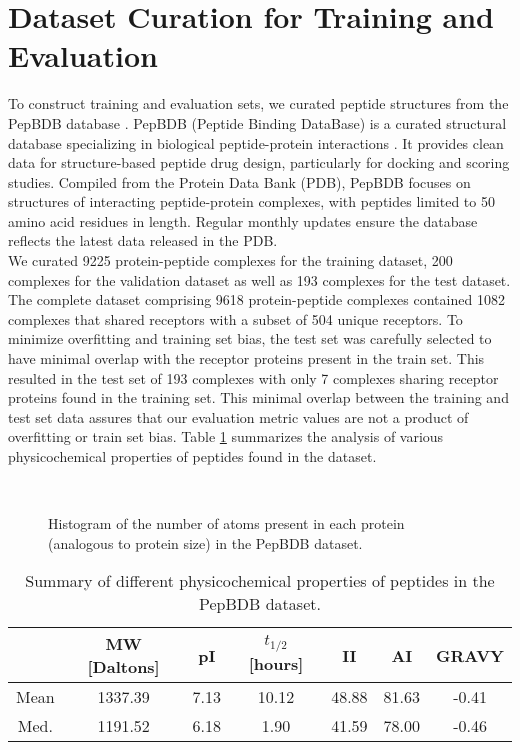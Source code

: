 \section{Dataset Curation for Training and Evaluation}
To construct training and evaluation sets, we curated peptide structures from the PepBDB database \cite{Wen2019}. PepBDB (Peptide Binding DataBase) is a curated structural database specializing in biological peptide-protein interactions \cite{Wen2019}. It provides clean data for structure-based peptide drug design, particularly for docking and scoring studies. Compiled from the Protein Data Bank (PDB), PepBDB focuses on structures of interacting peptide-protein complexes, with peptides limited to 50 amino acid residues in length. Regular monthly updates ensure the database reflects the latest data released in the PDB. \\

We curated 9225 protein-peptide complexes for the training dataset, 200 complexes for the validation dataset as well as 193 complexes for the test dataset. The complete dataset comprising 9618 protein-peptide complexes contained 1082 complexes that shared receptors with a subset of 504 unique receptors. To minimize overfitting and training set bias, the test set was carefully selected to have minimal overlap with the receptor proteins present in the train set. This resulted in the test set of 193 complexes with only 7 complexes sharing receptor proteins found in the training set. This minimal overlap between the training and test set data assures that our evaluation metric values are not a product of overfitting or train set bias. Table \ref{tab:pepbdb_pc_metrics} summarizes the analysis of various physicochemical properties of peptides found in the dataset. \\
\begin{figure}
  \center

   \\

  \caption{Histogram of the number of atoms present in each protein (analogous to protein size) in the PepBDB dataset.}

  \label{fig:residue_count}
\end{figure}

\begin{table}[ht]
\centering
\renewcommand{\arraystretch}{1.5}
\begin{tabular}{|c|c|c|c|c|c|c|}
      \hline
      & \multicolumn{1}{c|}{MW [Daltons]} & \multicolumn{1}{c|}{pI} & \multicolumn{1}{c|}{$t_{1/2}$ [hours]} & \multicolumn{1}{c|}{II} & \multicolumn{1}{c|}{AI} & \multicolumn{1}{c|}{GRAVY}\\
      \hline
      Mean          & 1337.39 & 7.13 & 10.12 & 48.88 & 81.63 & -0.41 \\
      Med.          & 1191.52 & 6.18 & 1.90 & 41.59 & 78.00 & -0.46 \\
      \hline
\end{tabular}
\renewcommand{\arraystretch}{1}
\caption{Summary of different physicochemical properties of peptides in the PepBDB dataset.}
\label{tab:pepbdb_pc_metrics}
\end{table}

